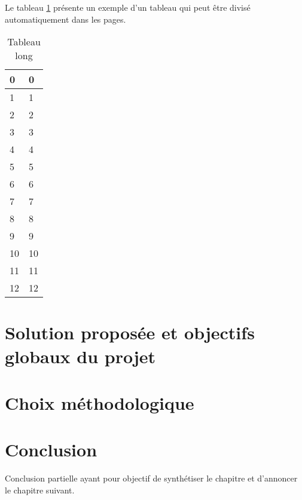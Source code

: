Le tableau \ref{tab:myfirstlongtable} présente un exemple d'un tableau qui peut être divisé automatiquement dans les pages.

\begin{longtable}[c]{
    |p{}
    |p{}|
}
    \caption{Tableau long}
    \label{tab:myfirstlongtable}\\
    \hline
    
    0
    & 0 \\
    \hline 
    
    1
    & 1 \\
    \hline 
    
    2
    & 2 \\
    \hline
    
    3
    & 3 \\
    \hline
    
    4
    & 4 \\
    \hline
    
    5
    & 5 \\ \hline
    
    6
    & 6 \\ \hline
    
    7
    & 7 \\
    \hline
    
    8
    & 8 \\
    \hline
    
    9
    & 9 \\
    \hline
    
    10
    & 10 \\
    \hline
    
    11
    & 11 \\
    \hline
    
    12
    & 12 \\
    \hline
\end{longtable}

\section{Solution proposée et objectifs globaux du projet}

\section{Choix méthodologique}

\section*{Conclusion}
    Conclusion partielle ayant pour objectif de synthétiser le chapitre et d’annoncer le chapitre suivant.